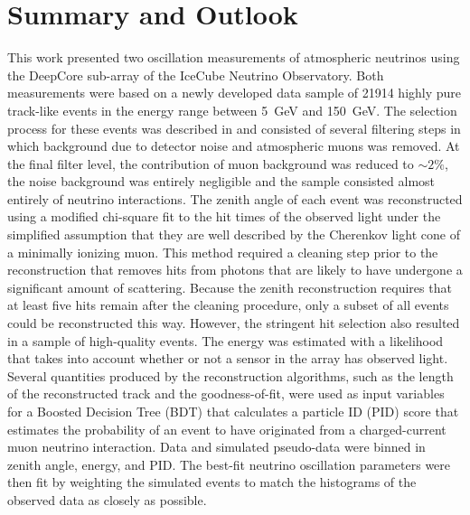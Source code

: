 \setchapterpreamble[u]{\margintoc}
\chapter{Summary and Outlook}

\label{sec:summary}

This work presented two oscillation measurements of atmospheric neutrinos using the DeepCore sub-array of the IceCube Neutrino Observatory. Both measurements were based on a newly developed data sample of \num{21914} highly pure track-like events in the energy range between \SI{5}{\giga\electronvolt} and \SI{150}{\giga\electronvolt}. The selection process for these events was described in  and consisted of several filtering steps in which background due to detector noise and atmospheric muons was removed. At the final filter level, the contribution of muon background was reduced to $\sim2\%$, the noise background was entirely negligible and the sample consisted almost entirely of neutrino interactions. The zenith angle of each event was reconstructed using a modified chi-square fit to the hit times of the observed light under the simplified assumption that they are well described by the Cherenkov light cone of a minimally ionizing muon. This method required a cleaning step prior to the reconstruction that removes hits from photons that are likely to have undergone a significant amount of scattering. Because the zenith reconstruction requires that at least five hits remain after the cleaning procedure, only a subset of all events could be reconstructed this way. However, the stringent hit selection also resulted in a sample of high-quality events. 
The energy was estimated with a likelihood that takes into account whether or not a sensor in the array has observed light. 
Several quantities produced by the reconstruction algorithms, such as the length of the reconstructed track and the goodness-of-fit, were used as input variables for a Boosted Decision Tree (BDT) that calculates a particle ID (PID) score that estimates the probability of an event to have originated from a charged-current muon neutrino interaction. Data and simulated pseudo-data were binned in zenith angle, energy, and PID. The best-fit neutrino oscillation parameters were then fit by weighting the simulated events to match the histograms of the observed data as closely as possible.

